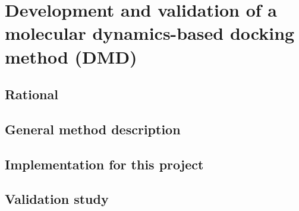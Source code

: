 \chapter{Development and validation of a molecular dynamics-based docking method (DMD)}
\section{Rational}
\lipsum[1-5]
\section{General method description}
\lipsum[1-5]
\section{Implementation for this project}
\lipsum[1-5]
\section{Validation study}
\lipsum[1-5]
